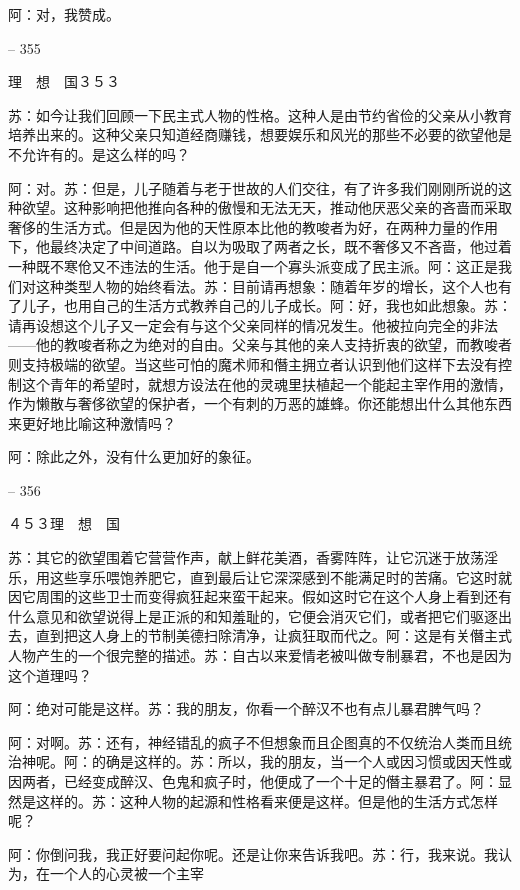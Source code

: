 \documentclass[11pt,oneside]{book}
\begin{document}
\begin{common-format}
    阿：对，我赞成。

    

-- 355

    理　想　国３５３

    苏：如今让我们回顾一下民主式人物的性格。这种人是由节约省俭的父亲从小教育培养出来的。这种父亲只知道经商赚钱，想要娱乐和风光的那些不必要的欲望他是不允许有的。是这么样的吗？

    阿：对。苏：但是，儿子随着与老于世故的人们交往，有了许多我们刚刚所说的这种欲望。这种影响把他推向各种的傲慢和无法无天，推动他厌恶父亲的吝啬而采取奢侈的生活方式。但是因为他的天性原本比他的教唆者为好，在两种力量的作用下，他最终决定了中间道路。自以为吸取了两者之长，既不奢侈又不吝啬，他过着一种既不寒伧又不违法的生活。他于是自一个寡头派变成了民主派。阿：这正是我们对这种类型人物的始终看法。苏：目前请再想象：随着年岁的增长，这个人也有了儿子，也用自己的生活方式教养自己的儿子成长。阿：好，我也如此想象。苏：请再设想这个儿子又一定会有与这个父亲同样的情况发生。他被拉向完全的非法——他的教唆者称之为绝对的自由。父亲与其他的亲人支持折衷的欲望，而教唆者则支持极端的欲望。当这些可怕的魔术师和僭主拥立者认识到他们这样下去没有控制这个青年的希望时，就想方设法在他的灵魂里扶植起一个能起主宰作用的激情，作为懒散与奢侈欲望的保护者，一个有刺的万恶的雄蜂。你还能想出什么其他东西来更好地比喻这种激情吗？

    阿：除此之外，没有什么更加好的象征。

    

-- 356

    ４５３理　想　国

    苏：其它的欲望围着它营营作声，献上鲜花美酒，香雾阵阵，让它沉迷于放荡淫乐，用这些享乐喂饱养肥它，直到最后让它深深感到不能满足时的苦痛。它这时就因它周围的这些卫士而变得疯狂起来蛮干起来。假如这时它在这个人身上看到还有什么意见和欲望说得上是正派的和知羞耻的，它便会消灭它们，或者把它们驱逐出去，直到把这人身上的节制美德扫除清净，让疯狂取而代之。阿：这是有关僭主式人物产生的一个很完整的描述。苏：自古以来爱情老被叫做专制暴君，不也是因为这个道理吗？

    阿：绝对可能是这样。苏：我的朋友，你看一个醉汉不也有点儿暴君脾气吗？

    阿：对啊。苏：还有，神经错乱的疯子不但想象而且企图真的不仅统治人类而且统治神呢。阿：的确是这样的。苏：所以，我的朋友，当一个人或因习惯或因天性或因两者，已经变成醉汉、色鬼和疯子时，他便成了一个十足的僭主暴君了。阿：显然是这样的。苏：这种人物的起源和性格看来便是这样。但是他的生活方式怎样呢？

    阿：你倒问我，我正好要问起你呢。还是让你来告诉我吧。苏：行，我来说。我认为，在一个人的心灵被一个主宰


\end{common-format}
\end{document}
